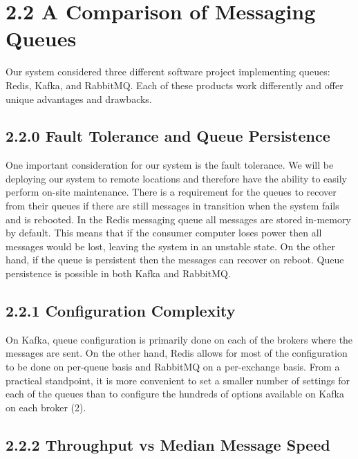 \documentclass[12pt]{report}
\begin{document}
\newpage\thispagestyle{fancy}\sectionfont{\scshape}
\section*{2.2 A Comparison of Messaging Queues}
\par\indent
Our system considered three different software project implementing queues: Redis, Kafka, and RabbitMQ. Each of these products work differently and offer unique advantages and drawbacks.

\subsection*{2.2.0 Fault Tolerance and Queue Persistence}

One important consideration for our system is the fault tolerance. We will be deploying our system to remote locations and therefore have the ability to easily perform on-site maintenance. There is a requirement for the queues to recover from their queues if there are still messages in transition when the system fails and is rebooted. In the Redis messaging queue all messages are stored in-memory by default. This means that if the consumer computer loses power then all messages would be lost, leaving the system in an unstable state. On the other hand, if the queue is persistent then the messages can recover on reboot. Queue persistence is possible in both Kafka and RabbitMQ.

\subsection*{2.2.1 Configuration Complexity}

On Kafka, queue configuration is primarily done on each of the brokers where the messages are sent. On the other hand, Redis allows for most of the configuration to be done on per-queue basis and RabbitMQ on a per-exchange basis. From a practical standpoint, it is more convenient to set a smaller number of settings for each of the queues than to configure the hundreds of options available on Kafka on each broker (2).

\subsection*{2.2.2 Throughput vs Median Message Speed}
\end{document}
